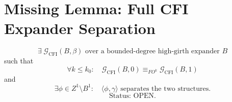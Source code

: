 \documentclass{article}
\begin{document}
\section*{Missing Lemma: Full CFI Expander Separation}
\[
\exists\;\mathcal{G}_{\mathrm{CFI}}(B,\beta)\text{ over a bounded-degree high-girth expander }B
\]
such that
\[
\forall k\le k_0:\quad \mathcal{G}_{\mathrm{CFI}}(B,0)\equiv_{FO^k}\mathcal{G}_{\mathrm{CFI}}(B,1)
\]
and
\[
\exists \phi\in Z^1\setminus B^1:
\quad
\langle \phi,\gamma\rangle
\text{ separates the two structures.}
\]
\[
\text{Status: OPEN.}
\]
\end{document}

